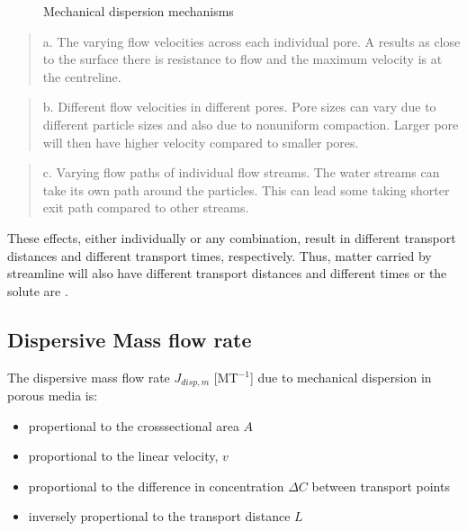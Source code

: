 \documentclass[letterpaper,10pt,english]{jupyterBook}
\begin{document}
\begin{figure}[htbp]
\centering
\capstart

\noindent{}
\caption{Mechanical dispersion mechanisms}\label{\detokenize{content/transport/L9/21_conservative_transport:mech-dis}}\end{figure}
\begin{quote}

\sphinxAtStartPar
a.  The varying flow velocities across each individual pore. A  results as close to the surface there is resistance to flow and the maximum velocity is at the centreline.
\end{quote}
\begin{quote}

\sphinxAtStartPar
b. Different flow velocities in different pores. Pore sizes can vary due to different particle sizes and also due to non\sphinxhyphen{}uniform compaction. Larger pore will then have higher velocity compared to smaller pores.
\end{quote}
\begin{quote}

\sphinxAtStartPar
c. Varying flow paths of individual flow streams. The water streams can take its own path around the particles. This can lead some taking shorter exit path compared to other streams.
\end{quote}

\sphinxAtStartPar
These effects, either individually or any combination, result in different transport distances and different transport times, respectively. Thus, matter carried by streamline will also have different transport distances and different times\sphinxhyphen{} or the solute are .


\subsection{Dispersive Mass flow rate}
\label{\detokenize{content/transport/L9/21_conservative_transport:dispersive-mass-flow-rate}}
\sphinxAtStartPar
The dispersive mass flow rate \(J_{disp, m}\) {[}MT\(^{-1}\){]} due to mechanical dispersion in porous media is:
\begin{itemize}
\item {} 
\sphinxAtStartPar
propertional to the cross\sphinxhyphen{}sectional area \(A\)

\item {} 
\sphinxAtStartPar
proportional to the linear velocity, \(v\)

\item {} 
\sphinxAtStartPar
proportional to the difference in concentration \(\Delta C\) between transport points

\item {} 
\sphinxAtStartPar
inversely propertional to the transport distance \(L\)

\end{itemize}
\end{document}
